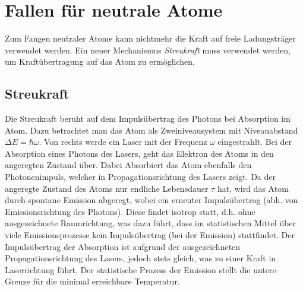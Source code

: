 \documentclass[twocolumn]{revtex4}
\begin{document}
\section{Fallen für neutrale Atome}

Zum Fangen neutraler Atome kann nichtmehr die Kraft auf freie Ladungsträger verwendet werden.
Ein neuer Mechanismus \emph{Streukraft} muss verwendet werden, um Kraftübertragung auf das Atom zu ermöglichen.

\subsection{Streukraft}
Die Streukraft beruht auf dem Impulsübertrag des Photons bei Absorption im Atom.
Dazu betrachtet man das Atom als Zweiniveausystem mit Niveauabstand $\Delta E = \hbar \omega$. Von rechts werde ein Laser mit der Frequenz $\omega$ eingestrahlt. Bei der Absorption eines Photons des Lasers, geht das Elektron des Atoms in den angeregten Zustand über. Dabei Absorbiert das Atom ebenfalls den Photonenimpuls, welcher in Propagationsrichtung des Lasers zeigt.
Da der angeregte Zustand des Atoms nur endliche Lebensdauer $\tau$ hat, wird das Atom durch spontane Emission abgeregt, wobei ein erneuter Impulsübertrag (abh. von Emissionsrichtung des Photons).
Diese findet isotrop statt, d.h. ohne ausgezeichnete Raumrichtung, was dazu führt, dass im statistischen Mittel über viele Emissionsprozesse kein Impulsübertrag (bei der Emission) stattfindet.
Der Impulsübertrag der Absorption ist aufgrund der ausgezeichneten Propagationsrichtung des Lasers, jedoch stets gleich, was zu einer Kraft in Laserrichtung führt.
Der statistische Prozess der Emission stellt die untere Grenze für die minimal erreichbare Temperatur.
\end{document}
